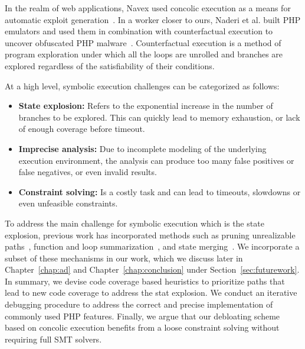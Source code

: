 In the realm of web applications, Navex used concolic execution as a means for automatic exploit generation~\cite{alhuzali2018navex}. 
In a worker closer to ours, Naderi et al. built PHP emulators and used them in combination with counterfactual execution to uncover obfuscated PHP malware~\cite{naderi2019cubismo,naderi2019malmax}. 
Counterfactual execution is a method of program exploration under which all the loops are unrolled and branches are explored regardless of the satisfiability of their conditions. 

At a high level, symbolic execution challenges can be categorized as follows:

\begin{itemize}
    \item \textbf{State explosion:} Refers to the exponential increase in the number of branches to be explored. This can quickly lead to memory exhaustion, or lack of enough coverage before timeout.
    \item \textbf{Imprecise analysis:} Due to incomplete modeling of the underlying execution environment, the analysis can produce too many false positives or false negatives, or even invalid results. 
    \item \textbf{Constraint solving:} Is a costly task and can lead to timeouts, slowdowns or even unfeasible constraints.
\end{itemize}

To address the main challenge for symbolic execution which is the state explosion, previous work has incorporated methods such as pruning unrealizable paths~\cite{schwartz2015conflict}, function and loop summarization~\cite{boonstoppel2008rwset, godefroid2007compositional, godefroid2011automatic, xie2016proteus}, and state merging~\cite{godefroid2007compositional, hansen2009state}. 
We incorporate a subset of these mechanisms in our work, which we discuss later in Chapter~\ref{chap:ad} and Chapter~\ref{chap:conclusion} under Section~\ref{sec:futurework}. 
In summary, we devise code coverage based heuristics to prioritize paths that lead to new code coverage to address the stat explosion. 
We conduct an iterative debugging procedure to address the correct and precise implementation of commonly used PHP features. 
Finally, we argue that our debloating scheme based on concolic execution benefits from a loose constraint solving without requiring full SMT solvers.
